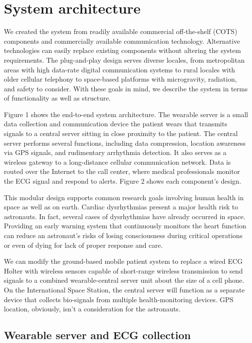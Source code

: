 \documentclass[a4paper,12pt]{article}
\begin{document}
\section{System architecture}


We created the system from readily available commercial off-the-shelf (COTS) components and commercially available communication technology. Alternative technologies can easily replace existing components without altering the system requirements. The plug-and-play design serves diverse locales, from metropolitan areas with high data-rate digital communication systems to rural locales with older cellular telephony to space-based platforms with microgravity, radiation, and safety to consider. With these goals in mind, we describe the system in terms of functionality as well as structure.

Figure 1 shows the end-to-end system architecture. The wearable server is a small data collection and communication device the patient wears that transmits signals to a central server sitting in close proximity to the patient. The central server performs several functions, including data compression, location awareness via GPS signals, and rudimentary arrhythmia detection. It also serves as a wireless gateway to a long-distance cellular communication network. Data is routed over the Internet to the call center, where medical professionals monitor the ECG signal and respond to alerts. Figure 2 shows each component’s design.

This modular design supports common research goals involving human health in space as well as on earth. Cardiac dysrhythmias present a major health risk to astronauts. In fact, several cases of dysrhythmias have already occurred in space. Providing an early warning system that continuously monitors the heart function can reduce an astronaut’s risks of losing consciousness during critical operations or even of dying for lack of proper response and care.

We can modify the ground-based mobile patient system to replace a wired ECG Holter with wireless sensors capable of short-range wireless transmission to send signals to a combined wearable-central server unit about the size of a cell phone. On the International Space Station, the central server will function as a separate device that collects bio-signals from multiple health-monitoring devices. GPS location, obviously, isn’t a consideration for the astronauts.

\subsection{Wearable server and ECG collection}
\end{document}
